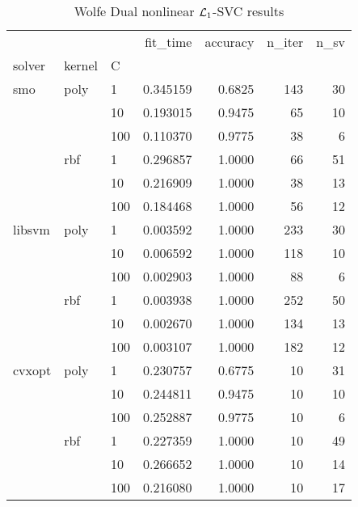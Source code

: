\begin{table}[H]
\centering
\caption{Wolfe Dual nonlinear $\protect \mathcal{L}_1$-SVC results}
\label{nonlinear_dual_l1_svc_cv_results}
\begin{tabular}{lllrrrr}
\toprule
       &     &     &  fit\_time &  accuracy &  n\_iter &  n\_sv \\
solver & kernel & C &           &           &         &       \\
\midrule
smo & poly & 1   &  0.345159 &    0.6825 &     143 &    30 \\
       &     & 10  &  0.193015 &    0.9475 &      65 &    10 \\
       &     & 100 &  0.110370 &    0.9775 &      38 &     6 \\
       & rbf & 1   &  0.296857 &    1.0000 &      66 &    51 \\
       &     & 10  &  0.216909 &    1.0000 &      38 &    13 \\
       &     & 100 &  0.184468 &    1.0000 &      56 &    12 \\
libsvm & poly & 1   &  0.003592 &    1.0000 &     233 &    30 \\
       &     & 10  &  0.006592 &    1.0000 &     118 &    10 \\
       &     & 100 &  0.002903 &    1.0000 &      88 &     6 \\
       & rbf & 1   &  0.003938 &    1.0000 &     252 &    50 \\
       &     & 10  &  0.002670 &    1.0000 &     134 &    13 \\
       &     & 100 &  0.003107 &    1.0000 &     182 &    12 \\
cvxopt & poly & 1   &  0.230757 &    0.6775 &      10 &    31 \\
       &     & 10  &  0.244811 &    0.9475 &      10 &    10 \\
       &     & 100 &  0.252887 &    0.9775 &      10 &     6 \\
       & rbf & 1   &  0.227359 &    1.0000 &      10 &    49 \\
       &     & 10  &  0.266652 &    1.0000 &      10 &    14 \\
       &     & 100 &  0.216080 &    1.0000 &      10 &    17 \\
\bottomrule
\end{tabular}
\end{table}
